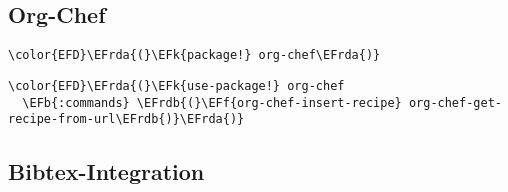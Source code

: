 \documentclass[12pt]{article}
\theoremstyle{plain}%
\theoremstyle{definition}
\theoremstyle{remark}
\newcommand{\EFk}[1]{\textcolor{EFk}{#1}} %
\newcommand{\EFb}[1]{\textcolor{EFb}{#1}} %
\newcommand{\EFf}[1]{\textcolor{EFf}{#1}} %
\newcommand{\EFrda}[1]{\textcolor{EFrda}{#1}} %
\newcommand{\EFrdb}[1]{\textcolor{EFrdb}{#1}} %
\begin{document}
\subsection{Org-Chef}
\label{sec:org3e225ab}
\begin{Code}
\begin{Verbatim}
\color{EFD}\EFrda{(}\EFk{package!} org-chef\EFrda{)}
\end{Verbatim}
\end{Code}
\begin{Code}
\begin{Verbatim}
\color{EFD}\EFrda{(}\EFk{use-package!} org-chef
  \EFb{:commands} \EFrdb{(}\EFf{org-chef-insert-recipe} org-chef-get-recipe-from-url\EFrdb{)}\EFrda{)}
\end{Verbatim}
\end{Code}

\subsection{Bibtex-Integration}
\label{sec:org681bfe8}
\end{document}
